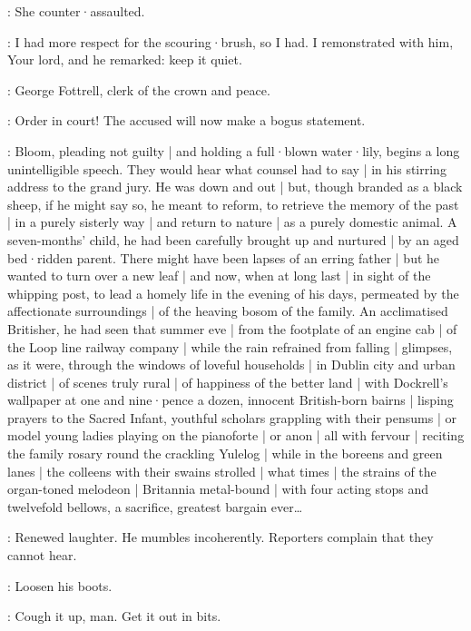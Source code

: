 \Bloom:
She counter·assaulted.

\Driscoll:
I had more respect for the scouring·brush,
so I had.
I remonstrated with him,
Your lord,
and he remarked:
keep it quiet.


:
George Fottrell,
clerk of the crown and peace.

\Fottrell:
Order in court!
The accused will now make a bogus statement.

:
Bloom,
pleading not guilty |
and holding a full·blown water·lily,
begins a long unintelligible speech.
They would hear what counsel had to say |
in his stirring address to the grand jury.
He was down and out |
but,
though branded as a black sheep,
if he might say so,
he meant to reform,
to retrieve the memory of the past |
in a purely sisterly way |
and return to nature |
as a purely domestic animal.
A seven-months' child,
he had been carefully brought up and nurtured |
by an aged bed·ridden parent.
There might have been lapses of an erring father |
but he wanted to turn over a new leaf |
and now,
when at long last |
in sight of the whipping post,
to lead a homely life in the evening of his days,
permeated by the affectionate surroundings |
of the heaving bosom of the family.
An acclimatised Britisher,
he had seen
that summer eve |
from the footplate of an engine cab |
of the Loop line railway company |
while the rain refrained from falling |
glimpses,
as it were,
through the windows of loveful households |
in Dublin city and urban district |
of scenes truly rural |
of happiness of the better land |
with Dockrell's wallpaper at one and nine·pence a dozen,
innocent British-born bairns |
lisping prayers to the Sacred Infant,
youthful scholars grappling with their pensums |
or model young ladies playing on the pianoforte |
or anon |
all with fervour |
reciting the family rosary round the crackling Yulelog |
while in the boreens and green lanes |
the colleens with their swains strolled |
what times |
the strains of the organ-toned melodeon |
Britannia metal-bound |
with four acting stops and twelvefold bellows,
a sacrifice,
greatest bargain ever\ldots

:
Renewed laughter.
He mumbles incoherently.
Reporters complain that they cannot hear.

\LongShortHand:
Loosen his boots.

\MacHugh:
Cough it up,
man.
Get it out in bits.

